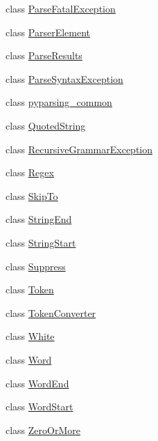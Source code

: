 \begin{DoxyCompactItemize}
\item 
class \hyperlink{classsetuptools_1_1__vendor_1_1pyparsing_1_1ParseFatalException}{Parse\+Fatal\+Exception}
\item 
class \hyperlink{classsetuptools_1_1__vendor_1_1pyparsing_1_1ParserElement}{Parser\+Element}
\item 
class \hyperlink{classsetuptools_1_1__vendor_1_1pyparsing_1_1ParseResults}{Parse\+Results}
\item 
class \hyperlink{classsetuptools_1_1__vendor_1_1pyparsing_1_1ParseSyntaxException}{Parse\+Syntax\+Exception}
\item 
class \hyperlink{classsetuptools_1_1__vendor_1_1pyparsing_1_1pyparsing__common}{pyparsing\+\_\+common}
\item 
class \hyperlink{classsetuptools_1_1__vendor_1_1pyparsing_1_1QuotedString}{Quoted\+String}
\item 
class \hyperlink{classsetuptools_1_1__vendor_1_1pyparsing_1_1RecursiveGrammarException}{Recursive\+Grammar\+Exception}
\item 
class \hyperlink{classsetuptools_1_1__vendor_1_1pyparsing_1_1Regex}{Regex}
\item 
class \hyperlink{classsetuptools_1_1__vendor_1_1pyparsing_1_1SkipTo}{Skip\+To}
\item 
class \hyperlink{classsetuptools_1_1__vendor_1_1pyparsing_1_1StringEnd}{String\+End}
\item 
class \hyperlink{classsetuptools_1_1__vendor_1_1pyparsing_1_1StringStart}{String\+Start}
\item 
class \hyperlink{classsetuptools_1_1__vendor_1_1pyparsing_1_1Suppress}{Suppress}
\item 
class \hyperlink{classsetuptools_1_1__vendor_1_1pyparsing_1_1Token}{Token}
\item 
class \hyperlink{classsetuptools_1_1__vendor_1_1pyparsing_1_1TokenConverter}{Token\+Converter}
\item 
class \hyperlink{classsetuptools_1_1__vendor_1_1pyparsing_1_1White}{White}
\item 
class \hyperlink{classsetuptools_1_1__vendor_1_1pyparsing_1_1Word}{Word}
\item 
class \hyperlink{classsetuptools_1_1__vendor_1_1pyparsing_1_1WordEnd}{Word\+End}
\item 
class \hyperlink{classsetuptools_1_1__vendor_1_1pyparsing_1_1WordStart}{Word\+Start}
\item 
class \hyperlink{classsetuptools_1_1__vendor_1_1pyparsing_1_1ZeroOrMore}{Zero\+Or\+More}
\end{DoxyCompactItemize}

